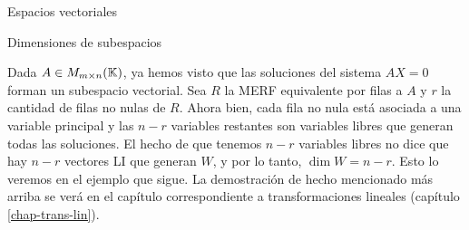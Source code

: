 \begin{chapter}{Espacios vectoriales}
    
    \begin{section}{Dimensiones de subespacios}\label{seccion-dimensiones-de-subespacios}
        
            
        Dada $A \in M_{m\times n}(\mathbb K)$,  ya hemos visto que  las soluciones del sistema $AX=0$ forman un subespacio vectorial. Sea $R $ la MERF equivalente por filas a $A$ y $r$ la cantidad de filas no nulas de $R$. Ahora bien, cada fila no nula está asociada  a una  variable principal y las  $n-r$ variables restantes son variables libres  que generan  todas las soluciones.
        El  hecho de que tenemos $n-r$ variables libres no dice que hay $n-r$ vectores LI que generan $W$, y por lo tanto,  $\dim W = n-r$. Esto lo veremos en el ejemplo que sigue. La demostración de hecho mencionado más arriba se verá en el capítulo correspondiente  a transformaciones lineales (capítulo \ref{chap-trans-lin}).
        

\end{section}
\end{chapter}
